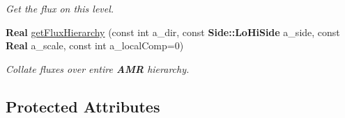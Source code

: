 \begin{DoxyCompactItemize}
\begin{DoxyCompactList}\small\item\em Get the flux on this level. \end{DoxyCompactList}\item 
\textbf{ Real} \hyperlink{class_level_domain_flux_register_aba734599020a9a525cd0763dc74799da}{get\+Flux\+Hierarchy} (const int a\+\_\+dir, const \textbf{ Side\+::\+Lo\+Hi\+Side} a\+\_\+side, const \textbf{ Real} a\+\_\+scale, const int a\+\_\+local\+Comp=0)
\begin{DoxyCompactList}\small\item\em Collate fluxes over entire \textbf{ A\+MR} hierarchy. \end{DoxyCompactList}\end{DoxyCompactItemize}
\subsection*{Protected Attributes}
